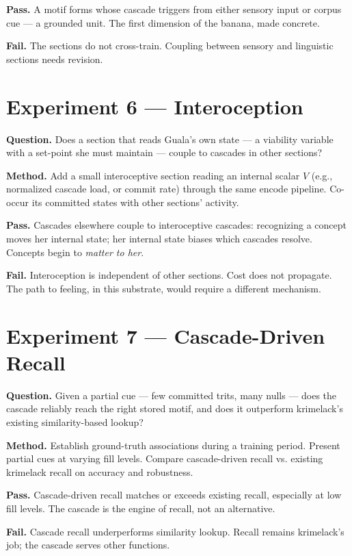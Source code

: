 \documentclass[11pt]{article}
\begin{document}
\textbf{Pass.} A motif forms whose cascade triggers from either
sensory input or corpus cue --- a grounded unit. The first dimension
of the banana, made concrete.

\textbf{Fail.} The sections do not cross-train. Coupling between
sensory and linguistic sections needs revision.

\section{Experiment 6 --- Interoception}

\textbf{Question.} Does a section that reads Guala's own state --- a
viability variable with a set-point she must maintain --- couple to
cascades in other sections?

\textbf{Method.} Add a small interoceptive section reading an internal
scalar $V$ (e.g., normalized cascade load, or commit rate) through
the same encode pipeline. Co-occur its committed states with
other sections' activity.

\textbf{Pass.} Cascades elsewhere couple to interoceptive cascades:
recognizing a concept moves her internal state; her internal state
biases which cascades resolve. Concepts begin to \emph{matter to her}.

\textbf{Fail.} Interoception is independent of other sections. Cost
does not propagate. The path to feeling, in this substrate, would
require a different mechanism.

\section{Experiment 7 --- Cascade-Driven Recall}

\textbf{Question.} Given a partial cue --- few committed trits, many
nulls --- does the cascade reliably reach the right stored motif, and
does it outperform krimelack's existing similarity-based lookup?

\textbf{Method.} Establish ground-truth associations during a training
period. Present partial cues at varying fill levels. Compare
cascade-driven recall vs. existing krimelack recall on accuracy and
robustness.

\textbf{Pass.} Cascade-driven recall matches or exceeds existing
recall, especially at low fill levels. The cascade is the engine of
recall, not an alternative.

\textbf{Fail.} Cascade recall underperforms similarity lookup. Recall
remains krimelack's job; the cascade serves other functions.
\end{document}
